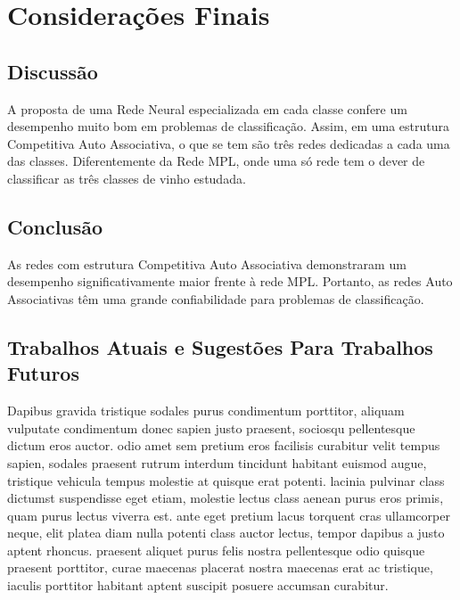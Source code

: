 \section{Considerações Finais} \label{consideracoesFinais}

\subsection{Discussão}

A proposta de uma Rede Neural especializada em cada classe confere um desempenho muito bom em problemas de classificação. Assim, em uma estrutura Competitiva Auto Associativa, o que se tem são três redes dedicadas a cada uma das classes. Diferentemente da Rede MPL, onde uma só rede tem o dever de classificar as três classes de vinho estudada.


\subsection{Conclusão}

As redes com estrutura Competitiva Auto Associativa demonstraram um desempenho significativamente maior frente à rede MPL. Portanto, as redes Auto Associativas têm uma grande confiabilidade para problemas de classificação.


\subsection{Trabalhos Atuais e Sugestões Para Trabalhos Futuros}

Dapibus gravida tristique sodales purus condimentum porttitor, aliquam vulputate condimentum donec sapien justo praesent, sociosqu pellentesque dictum eros auctor. odio amet sem pretium eros facilisis curabitur velit tempus sapien, sodales praesent rutrum interdum tincidunt habitant euismod augue, tristique vehicula tempus molestie at quisque erat potenti. lacinia pulvinar class dictumst suspendisse eget etiam, molestie lectus class aenean purus eros primis, quam purus lectus viverra est. ante eget pretium lacus torquent cras ullamcorper neque, elit platea diam nulla potenti class auctor lectus, tempor dapibus a justo aptent rhoncus. praesent aliquet purus felis nostra pellentesque odio quisque praesent porttitor, curae maecenas placerat nostra maecenas erat ac tristique, iaculis porttitor habitant aptent suscipit posuere accumsan curabitur. 